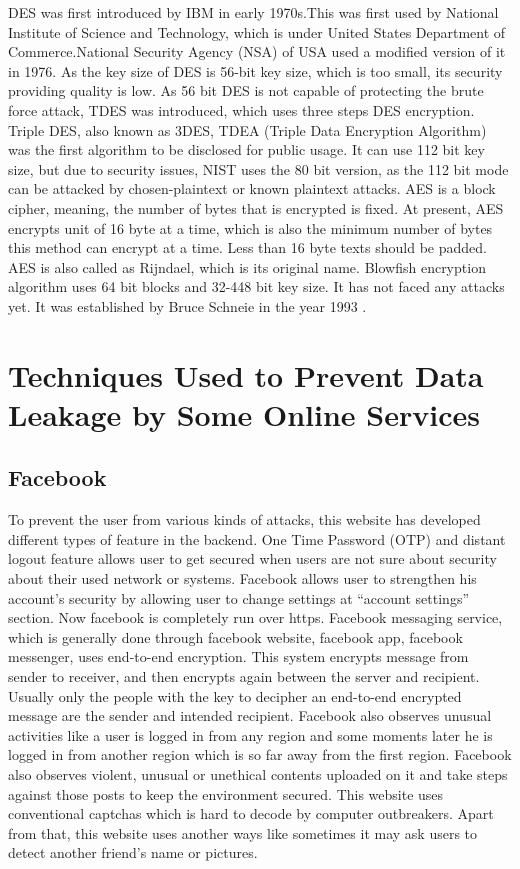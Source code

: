 \documentclass[12pt,a4paper,conference]{IEEEtran}
\begin{document}
 DES was first introduced by IBM in early 1970s.This was first used by National Institute of Science and Technology, which is under United States Department of Commerce.National Security Agency (NSA) of USA used a modified version of it in 1976.  As the key size of DES is 56-bit key size, which is too small, its security providing quality is low. As 56 bit DES is not capable of protecting the brute force attack, TDES was introduced, which uses three steps DES encryption. Triple DES, also known as 3DES, TDEA (Triple Data Encryption Algorithm)\autocite{barker2017recommendation} was the first algorithm to be disclosed for public usage. It can use 112 bit key size, but due to security issues, NIST uses the 80 bit version, as the 112 bit mode can be attacked by chosen-plaintext or known plaintext attacks.\autocite{merkle1981security} \autocite{van1990known} AES is a block cipher, meaning, the number of bytes that is encrypted is fixed. At present, AES encrypts unit of 16 byte at a time, which is also the minimum number of bytes this method can encrypt at a time. Less than 16 byte texts should be padded. \autocite{berent2013advanced}  AES is also called as Rijndael, which is its original name.\autocite{daemen1999aes} Blowfish encryption algorithm uses 64 bit blocks and 32-448 bit key size. It has not faced any attacks yet.\autocite{laser2016comparative} It was established by Bruce
Schneie in the year 1993 \autocite{malhotra2013study}.

\section{Techniques Used to Prevent Data Leakage by Some Online Services}

\subsection{Facebook}
To prevent the user from various kinds of attacks, this website has developed different types of feature in the backend. One Time Password (OTP) and distant logout feature allows user to get secured when users are not sure about security about their used network or systems. Facebook allows user to strengthen his account’s security by allowing user to change settings at “account settings” section. Now facebook is completely run over https. Facebook messaging service, which is generally done through facebook website, facebook app, facebook messenger, uses end-to-end encryption. This system encrypts message from sender to receiver, and then encrypts again between the server and recipient. Usually only the people with the key to decipher an end-to-end encrypted message are the sender and intended recipient. Facebook also observes unusual activities like a user is logged in from any region and some moments later he is logged in from another region which is so far away from the first region. Facebook also observes violent, unusual or unethical contents uploaded on it and take steps against those posts to keep the environment secured. This website uses conventional captchas which is hard to decode by computer outbreakers. Apart from that, this website uses another ways like sometimes it may ask users to detect another friend’s name or pictures. \autocite{neha16}
\end{document}
